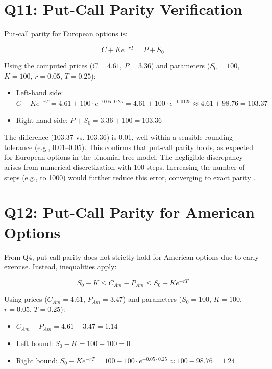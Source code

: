 \documentclass{article}
\begin{document}
\section*{Q11: Put-Call Parity Verification}

Put-call parity for European options is:

\begin{equation}
C + Ke^{-rT} = P + S_0
\end{equation}

Using the computed prices ($C = 4.61$, $P = 3.36$) and parameters ($S_0 = 100$, $K = 100$, $r = 0.05$, $T = 0.25$):

\begin{itemize}
    \item Left-hand side: $C + Ke^{-rT} = 4.61 + 100 \cdot e^{-0.05 \cdot 0.25} = 4.61 + 100 \cdot e^{-0.0125} \approx 4.61 + 98.76 = 103.37$
    \item Right-hand side: $P + S_0 = 3.36 + 100 = 103.36$
\end{itemize}

The difference (103.37 vs. 103.36) is 0.01, well within a sensible rounding tolerance (e.g., 0.01–0.05). This confirms that put-call parity holds, as expected for European options in the binomial tree model. The negligible discrepancy arises from numerical discretization with 100 steps. Increasing the number of steps (e.g., to 1000) would further reduce this error, converging to exact parity \citep{hull2018options, cox1979option}.


\section*{Q12: Put-Call Parity for American Options}

From Q4, put-call parity does not strictly hold for American options due to early exercise. Instead, inequalities apply:

\begin{equation}
S_0 - K \leq C_{Am} - P_{Am} \leq S_0 - Ke^{-rT}
\end{equation}

Using prices ($C_{Am} = 4.61$, $P_{Am} = 3.47$) and parameters ($S_0 = 100$, $K = 100$, $r = 0.05$, $T = 0.25$):

\begin{itemize}
    \item $C_{Am} - P_{Am} = 4.61 - 3.47 = 1.14$
    \item Left bound: $S_0 - K = 100 - 100 = 0$
    \item Right bound: $S_0 - Ke^{-rT} = 100 - 100 \cdot e^{-0.05 \cdot 0.25} \approx 100 - 98.76 = 1.24$
\end{itemize}
\end{document}
